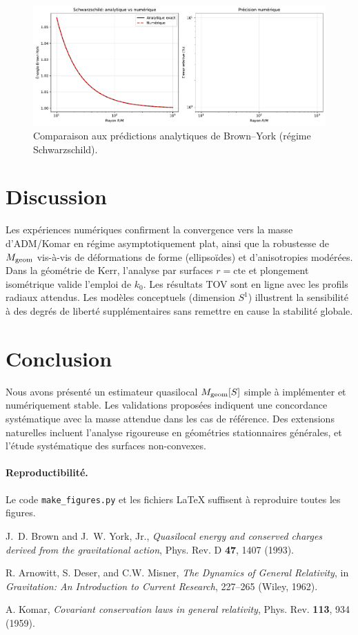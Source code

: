 \documentclass[11pt,a4paper]{article}
\theoremstyle{remark}
\begin{document}
\begin{figure}[htbp]
  \centering
  \includegraphics[width=\linewidth]{fig_theoretical_comparison.pdf}
  \caption{Comparaison aux prédictions analytiques de Brown–York (régime Schwarzschild).}
  \label{fig:fig_theoretical_comparison}
\end{figure}


\section{Discussion}
Les expériences numériques confirment la convergence vers la masse d'ADM/Komar en régime asymptotiquement plat,
ainsi que la robustesse de $M_{\rm geom}$ vis-à-vis de déformations de forme (ellipsoïdes) et d'anisotropies modérées.
Dans la géométrie de Kerr, l'analyse par surfaces $r=\mathrm{cte}$ et plongement isométrique valide l'emploi de $k_0$.
Les résultats TOV sont en ligne avec les profils radiaux attendus. Les modèles conceptuels (dimension $S^1$)
illustrent la sensibilité à des degrés de liberté supplémentaires sans remettre en cause la stabilité globale.

\section{Conclusion}
Nous avons présenté un estimateur quasilocal $M_{\rm geom}[S]$ simple à implémenter et numériquement stable.
Les validations proposées indiquent une concordance systématique avec la masse attendue dans les cas de référence.
Des extensions naturelles incluent l'analyse rigoureuse en géométries stationnaires générales, et l'étude
systématique des surfaces non-convexes.

\paragraph{Reproductibilité.} Le code \texttt{make\_figures.py} et les fichiers \LaTeX{} suffisent à reproduire toutes les figures.

\begin{thebibliography}{9}
J.~D. Brown and J.~W. York, Jr.,
\emph{Quasilocal energy and conserved charges derived from the gravitational action},
Phys. Rev. D \textbf{47}, 1407 (1993).

R. Arnowitt, S. Deser, and C.W. Misner,
\emph{The Dynamics of General Relativity},
in \emph{Gravitation: An Introduction to Current Research}, 227–265 (Wiley, 1962).

A. Komar, \emph{Covariant conservation laws in general relativity},
Phys. Rev. \textbf{113}, 934 (1959).
\end{thebibliography}
\end{document}
